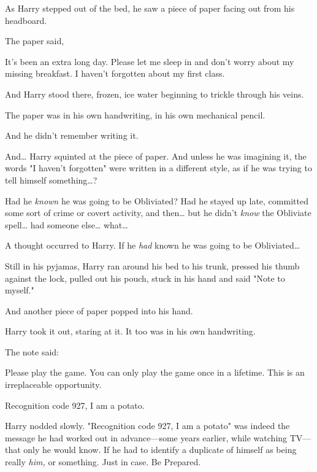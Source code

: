 As Harry stepped out of the bed, he saw a piece of paper facing out from his 
headboard.

The paper said,

\begin{writtenNote}

It's been an extra long day. Please let me sleep in and don't worry about 
my missing breakfast. I haven't forgotten about my first class.

\end{writtenNote}

And Harry stood there, frozen, ice water beginning to trickle through his veins.

The paper was in his own handwriting, in his own mechanical pencil.

And he didn't remember writing it.

And{\ldots} Harry squinted at the piece of paper. And unless he was imagining 
it, the words "I haven't forgotten" were written in a different style, as if he 
was trying to tell himself something{\ldots}?

Had he \emph{known} he was going to be Obliviated? Had he stayed up late, 
committed some sort of crime or covert activity, and then{\ldots} but he didn't 
\emph{know} the Obliviate spell{\ldots} had someone else{\ldots} what{\ldots}

A thought occurred to Harry. If he \emph{had} known he was going to be 
Obliviated{\ldots}

Still in his pyjamas, Harry ran around his bed to his trunk, pressed his thumb 
against the lock, pulled out his pouch, stuck in his hand and said "Note to 
myself."

And another piece of paper popped into his hand.

Harry took it out, staring at it. It too was in his own handwriting.

The note said:

\begin{writtenNote}

Please play the game. You can only play the game once in a lifetime. This 
is an irreplaceable opportunity.

Recognition code 927, I am a potato.

\end{writtenNote}

Harry nodded slowly. "Recognition code 927, I am a potato" was indeed the 
message he had worked out in advance---some years earlier, while watching 
TV---that only he would know. If he had to identify a duplicate of himself as 
being really \emph{him,} or something. Just in case. Be Prepared.

